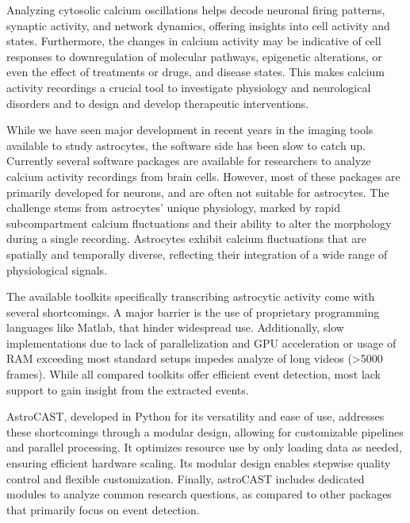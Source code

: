 Analyzing cytosolic calcium oscillations helps decode neuronal firing patterns, synaptic activity, and network dynamics, offering insights into cell activity and states\citep{del_negro_sodium_2005,grienberger_imaging_2012,dombeck_imaging_2007}. Furthermore, the changes in calcium activity may be indicative of cell responses to downregulation of molecular pathways, epigenetic alterations, or even the effect of treatments or drugs, and disease states\citep{lines_astrocytes_2020,miller_calcium_2023,robil_glioblastoma_2015,huang_vitro_2013,britti_tau_2020,zhang_estrogen_2010}. This makes calcium activity recordings a crucial tool to investigate physiology and neurological disorders and to design and develop therapeutic interventions.

While we have seen major development in recent years in the imaging tools available to study astrocytes, the software side has been slow to catch up\citep{gorzo_photonics_2022,aryal_er-gcamp6f_2022,stobart_cortical_2018}. Currently several software packages are available for researchers to analyze calcium activity recordings from brain cells. However, most of these packages are primarily developed for neurons, and are often not suitable for astrocytes. The challenge stems from astrocytes' unique physiology, marked by rapid subcompartment calcium fluctuations\citep{stobart_long-term_2018,curreli_complementary_2022} and their ability to alter the morphology during a single recording\citep{anders_epileptic_2024,baorto_astrocyte_1992}. Astrocytes exhibit calcium fluctuations that are spatially and temporally diverse, reflecting their integration  of a wide range of physiological signals\citep{semyanov_making_2020,smedler_frequency_2014,denizot_simulation_2019,papouin_astrocytic_2017,bazargani_astrocyte_2016}.

The available toolkits specifically transcribing astrocytic activity come with several shortcomings. A major barrier is the use of proprietary programming languages like Matlab, that hinder widespread use. Additionally, slow implementations due to lack of parallelization and \ac{GPU} acceleration or usage of RAM exceeding most standard setups impedes analyze of long videos (>5000 frames). While all compared toolkits offer efficient event detection, most lack support to gain insight from the extracted events.

AstroCAST, developed in Python for its versatility and ease of use, addresses these shortcomings through a modular design, allowing for customizable pipelines and parallel processing.  It optimizes resource use by only loading data as needed, ensuring efficient hardware scaling. Its modular design enables stepwise quality control and flexible customization. Finally, astroCAST includes dedicated modules to analyze common research questions, as compared to other packages that primarily focus on event detection.

